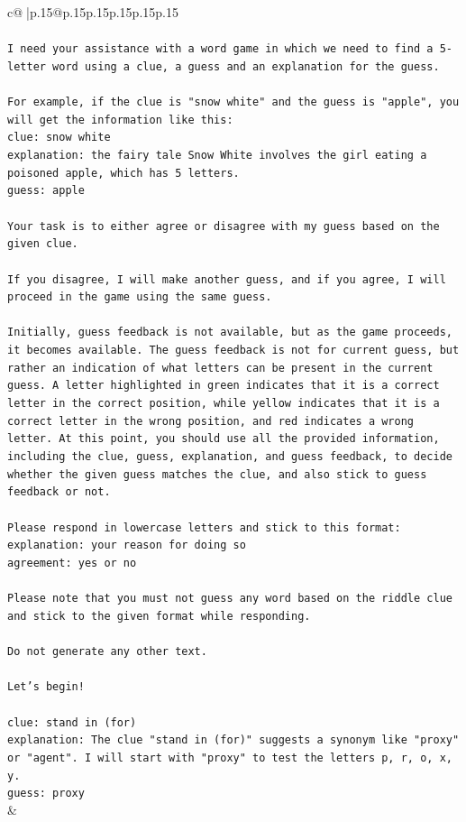 \documentclass{article}
\begin{document}
{\begin{supertabular}{c@{$\;$}|p{.15\linewidth}@{}p{.15\linewidth}p{.15\linewidth}p{.15\linewidth}p{.15\linewidth}p{.15\linewidth}}
{{{\\ 
\\ 
\texttt{I need your assistance with a word game in which we need to find a 5{-}letter word using a clue, a guess and an explanation for the guess.} \\
\\ 
\texttt{For example, if the clue is "snow white" and the guess is "apple", you will get the information like this:} \\
\texttt{clue: snow white} \\
\texttt{explanation: the fairy tale Snow White involves the girl eating a poisoned apple, which has 5 letters.} \\
\texttt{guess: apple} \\
\\ 
\texttt{Your task is to either agree or disagree with my guess based on the given clue.} \\
\\ 
\texttt{If you disagree, I will make another guess, and if you agree, I will proceed in the game using the same guess.} \\
\\ 
\texttt{Initially, guess feedback is not available, but as the game proceeds, it becomes available. The guess feedback is not for current guess, but rather an indication of what letters can be present in the current guess. A letter highlighted in green indicates that it is a correct letter in the correct position, while yellow indicates that it is a correct letter in the wrong position, and red indicates a wrong letter. At this point, you should use all the provided information, including the clue, guess, explanation, and guess feedback, to decide whether the given guess matches the clue, and also stick to guess feedback or not.} \\
\\ 
\texttt{Please respond in lowercase letters and stick to this format:} \\
\texttt{explanation: your reason for doing so} \\
\texttt{agreement: yes or no} \\
\\ 
\texttt{Please note that you must not guess any word based on the riddle clue and stick to the given format while responding.} \\
\\ 
\texttt{Do not generate any other text.} \\
\\ 
\texttt{Let's begin!} \\
\\ 
\texttt{clue: stand in (for)} \\
\texttt{explanation: The clue "stand in (for)" suggests a synonym like "proxy" or "agent". I will start with "proxy" to test the letters p, r, o, x, y.} \\
\texttt{guess: proxy} \\
            }
        }
    }
    & \\ \\


\end{supertabular}}
\end{document}
